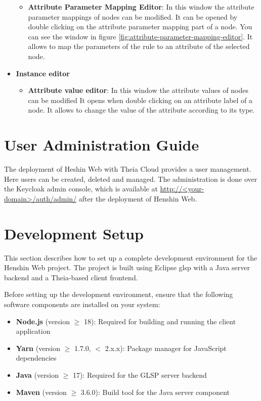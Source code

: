 \begin{itemize}
\begin{itemize}
        \item \textbf{Attribute Parameter Mapping Editor}: In this window the attribute parameter mappings of nodes can be modified. It can be opened by double clicking on the attribute parameter mapping part of a node. You can see the window in figure \ref{fig:attribute-parameter-mapping-editor}. It allows to map the parameters of the rule to an attribute of the selected node.
    \end{itemize}
    \item \textbf{Instance editor}
    \begin{itemize}
        \item \textbf{Attribute value editor}: In this window the attribute values of nodes can be modified It opens when double clicking on an attribute label of a node. It allows to change the value of the attribute according to its type.
    \end{itemize}
\end{itemize}

\section{User Administration Guide}
\label{sec:admin-guide}

The deployment of Heshin Web with Theia Cloud provides a user management. Here users can be created, deleted and managed. The administration is done over the Keycloak admin console, which is available at \url{http://<your-domain>/auth/admin/} after the deployment of Henshin Web. 



\section{Development Setup}
\label{sec:dev-setup}

This section describes how to set up a complete development environment for the Henshin Web project. The project is built using Eclipse \ac{glsp} with a Java server backend and a Theia-based client frontend.

Before setting up the development environment, ensure that the following software components are installed on your system:

\begin{itemize}
    \item \textbf{Node.js} (version $\geq$ 18): Required for building and running the client application
    \item \textbf{Yarn} (version $\geq$ 1.7.0, $<$ 2.x.x): Package manager for JavaScript dependencies
    \item \textbf{Java} (version $\geq$ 17): Required for the GLSP server backend
    \item \textbf{Maven} (version $\geq$ 3.6.0): Build tool for the Java server component
\end{itemize}

